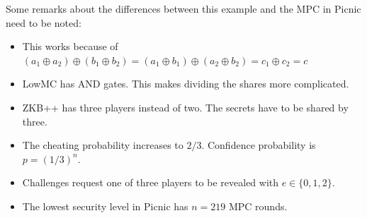 \documentclass[]{article}
\begin{document}
Some remarks about the differences between this example and the MPC in Picnic need to be noted:
\begin{itemize}
\item{This works because of $(a_1 \oplus a_2) \oplus (b_1 \oplus b_2) = (a_1 \oplus b_1) \oplus (a_2 \oplus b_2) = c_1 \oplus c_2 = c$}
\item{LowMC has AND gates. This makes dividing the shares more complicated.}
\item{ZKB++ has three players instead of two. The secrets have to be shared by three.}
\item{The cheating probability increases to $2/3$. Confidence probability is $p=(1/3)^n$.}
\item{Challenges request one of three players to be revealed with $e \in \{0,1,2\}$.}
\item{The lowest security level in Picnic has $n = 219$ MPC rounds.}
\end{itemize} 
\end{document}
